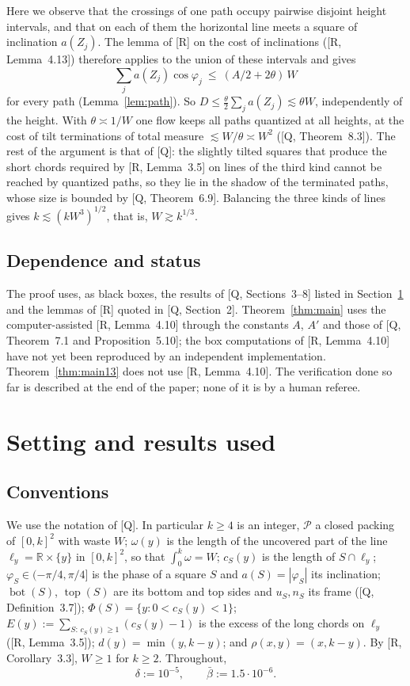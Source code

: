 \documentclass[11pt]{amsart}
\newcommand{\R}{\mathbb R}
\newcommand{\cP}{\mathcal P}
\newcommand{\Bot}{\operatorname{bot}}
\newcommand{\Top}{\operatorname{top}}
\newcommand{\bbar}{\bar\beta}
\theoremstyle{definition}
\theoremstyle{remark}
\numberwithin{equation}{section}
\begin{document}
Here we observe that the crossings of one path occupy pairwise disjoint height intervals, and that on each of them the
horizontal line meets a square of inclination $a(Z_j)$. The lemma of [R] on the cost of inclinations ([R, Lemma~4.13])
therefore applies to the union of these intervals and gives
\[
\sum_j a(Z_j)\cos\varphi_j\ \le\ (A/2+2\theta)\,W
\]
for every path (Lemma~\ref{lem:path}). So $D\le\frac\theta2\sum_ja(Z_j)\lesssim\theta W$, independently of the height.
With $\theta\asymp1/W$ one flow keeps all paths quantized at all heights, at the cost of tilt terminations of total
measure $\lesssim W/\theta\asymp W^2$ ([Q, Theorem~8.3]). The rest of the argument is that of [Q]: the slightly tilted
squares that produce the short chords required by [R, Lemma~3.5] on lines of the third kind cannot be reached by
quantized paths, so they lie in the shadow of the terminated paths, whose size is bounded by [Q, Theorem~6.9]. Balancing
the three kinds of lines gives $k\lesssim(kW^3)^{1/2}$, that is, $W\gtrsim k^{1/3}$.

\subsection{Dependence and status}\label{ssec:status}
The proof uses, as black boxes, the results of [Q, Sections~3--8] listed in Section~\ref{sec:setting} and the lemmas
of [R] quoted in [Q, Section~2]. Theorem~\ref{thm:main} uses the computer-assisted [R, Lemma~4.10] through the constants
$A$, $A'$ and those of [Q, Theorem~7.1 and Proposition~5.10]; the box computations of [R, Lemma~4.10] have not yet been
reproduced by an independent implementation. Theorem~\ref{thm:main13} does not use [R, Lemma~4.10]. The verification done so far is described at the end of the paper; none of it is by a human referee.

\section{Setting and results used}\label{sec:setting}

\subsection{Conventions}
We use the notation of [Q]. In particular $k\ge4$ is an integer, $\cP$ a closed packing of $[0,k]^2$ with waste $W$;
$\omega(y)$ is the length of the uncovered part of the line $\ell_y=\R\times\{y\}$ in $[0,k]^2$, so that
$\int_0^k\omega=W$; $c_S(y)$ is the length of $S\cap\ell_y$; $\varphi_S\in(-\pi/4,\pi/4]$ is the phase of a square $S$ and
$a(S)=|\varphi_S|$ its inclination; $\Bot(S)$, $\Top(S)$ are its bottom and top sides and $u_S,n_S$ its frame
([Q, Definition~3.7]); $\Phi(S)=\{y:0<c_S(y)<1\}$; $E(y):=\sum_{S:\,c_S(y)\ge1}(c_S(y)-1)$ is the excess of the long
chords on $\ell_y$ ([R, Lemma~3.5]); $d(y)=\min(y,k-y)$; and $\rho(x,y)=(x,k-y)$. By [R, Corollary~3.3], $W\ge1$ for
$k\ge2$. Throughout,
\[
\delta:=10^{-5},\qquad\bbar:=1.5\cdot10^{-6}.
\]
\end{document}
